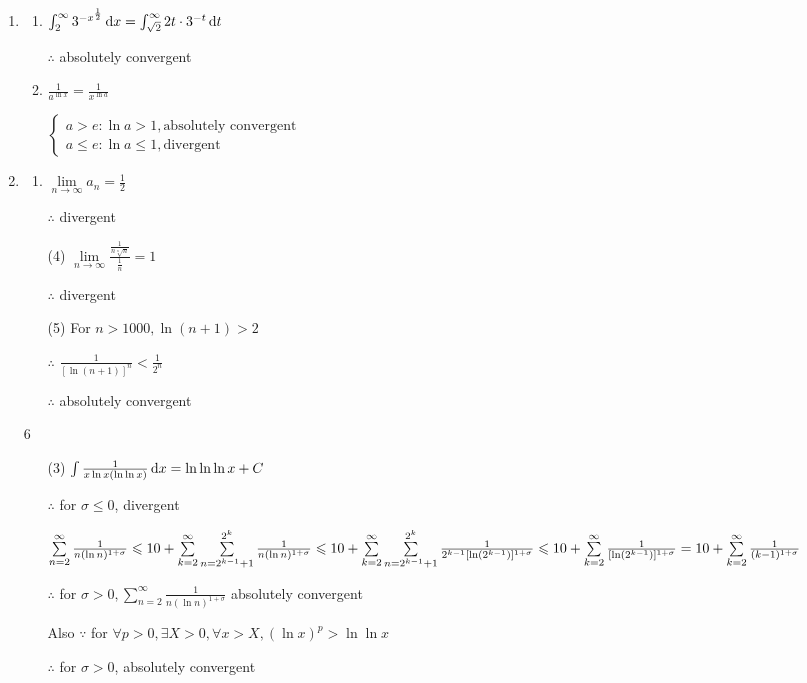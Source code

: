 \begin{enumerate}[1]
   \item
   \begin{enumerate}[(1)]
     \item
     $\int_{2}^{\infty} 3^{-x^{\frac{1}{2}}} \dif x=\int_{\sqrt{2}}^{\infty} 2t\cdot 3^{-t} \dif t$
     \par $\therefore$ absolutely convergent

     \item
     $\frac{1}{a^{\ln x}}=\frac{1}{x^{\ln a}}$
     \par $\begin{cases} a>e:\ln a>1,\text{absolutely convergent}\\a\leqslant e:\ln a\leqslant 1,\text{divergent} \end{cases}$
   \end{enumerate}

   \item
   \begin{enumerate}[(1)]
     \item
     $\lim\limits_{n\rightarrow{\infty}}a_n=\frac{1}{2}$
     \par $\therefore$ divergent

     \item[(4)]
     $\lim\limits_{n\rightarrow{\infty}}\frac{\frac{1}{n \sqrt[n]{n}}}{\frac{1}{n}}=1$
     \par $\therefore$ divergent

     \item[(5)]
     For $n>1000,\ln (n+1)>2$
     \par $\therefore$ $\frac{1}{[\ln (n+1)]^n}<\frac{1}{2^n}$
     \par $\therefore$ absolutely convergent
   \end{enumerate}

   \item[6]
   \begin{enumerate}[(1)]
     \item[(3)]
     $\int \frac{1}{x\ln x(\ln \ln x)} \dif x=\ln \ln \ln x+C$
     \par $\therefore$ for $\sigma \leqslant 0$, divergent
     \par $\sum\limits_{n=2}^{\infty}\frac{1}{n(\ln n)^{1+\sigma}}\leqslant10+\sum\limits_{k=2}^{\infty}\sum\limits_{n=2^{k-1}+1}^{2^k}\frac{1}{n(\ln n)^{1+\sigma}}\\
     \leqslant 10+\sum\limits_{k=2}^{\infty}\sum\limits_{n=2^{k-1}+1}^{2^k}\frac{1}{2^{k-1}[\ln (2^{k-1})]^{1+\sigma}}\\
     \leqslant 10+\sum\limits_{k=2}^{\infty}\frac{1}{[\ln (2^{k-1})]^{1+\sigma}}\\
     =10+\sum\limits_{k=2}^{\infty}\frac{1}{(k-1)^{1+\sigma}}$
     \par $\therefore$ for $\sigma>0, \sum\limits_{n=2}^{\infty}\frac{1}{n(\ln n)^{1+\sigma}}$ absolutely convergent
     \par Also $\because$ for $\forall p>0, \exists X>0, \forall x>X, (\ln x)^p>\ln \ln x$
     \par $\therefore$ for $\sigma>0$, absolutely convergent


\end{enumerate}
\end{enumerate}
